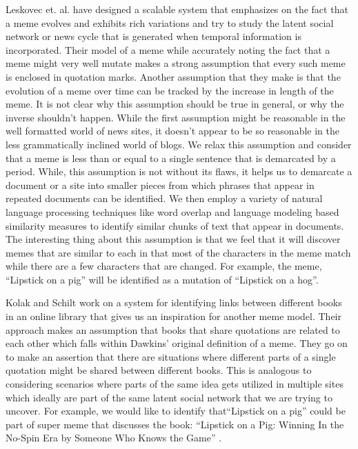 \documentclass{acm_proc_article-sp}
\begin{document}
Leskovec et. al. \cite{leskovec2009meme} have designed a scalable system that emphasizes on the fact that a meme evolves and exhibits rich variations and try to study the latent social network or news cycle that is generated when temporal information is incorporated. Their model of a meme while accurately noting the fact that a meme might very well mutate makes a strong assumption that every such meme is enclosed in quotation marks. Another assumption that they make is that the evolution of a meme over time can be tracked by the increase in length of the meme. It is not clear why this assumption should be true in general, or why the inverse shouldn't happen. While the first assumption might be reasonable in the well formatted world of news sites, it doesn't appear to be so reasonable in the less grammatically inclined world of blogs. We relax this assumption and consider that a meme is less than or equal to a single sentence that is demarcated by a period. While, this assumption is not without its flaws, it helps us to demarcate a document or a site into smaller pieces from which phrases that appear in repeated documents can be identified. We then employ a variety of natural language processing techniques like word overlap and language modeling based similarity measures to identify similar chunks of text that appear in documents. The interesting thing about this assumption is that we feel that it will discover memes that are similar to each in that most of the characters in the meme match while there are a few characters that are changed. For example, the meme, ``Lipstick on a pig'' will be identified as a mutation of ``Lipstick on a hog''. 

Kolak and Schilt \cite{kolak2008generating} work on a system for identifying links between different books in an online library that gives us an inspiration for another meme model. Their approach makes an assumption that books that share quotations are related to each other which falls within Dawkins' original definition of a meme. They go on to make an assertion that there are situations where different parts of a single quotation might be shared between different books. This is analogous to considering scenarios where parts of the same idea gets utilized in multiple sites which ideally are part of the same latent social network that we are trying to uncover. For example, we would like to identify that``Lipstick on a pig'' could be part of super meme that discusses the book: ``Lipstick on a Pig: Winning In the No-Spin Era by Someone Who Knows the Game'' \cite{clarke2006lipstick}.  
\end{document}
